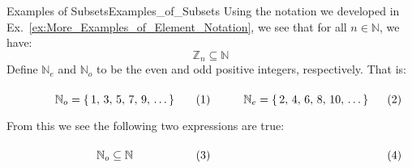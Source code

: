             \begin{lexample}{Examples of Subsets}{Examples_of_Subsets}
                Using the notation we developed in
                Ex.~\ref{ex:More_Examples_of_Element_Notation}, we see that
                for all $n\in\mathbb{N}$, we have:
                \begin{equation}
                    \mathbb{Z}_{n}\subseteq\mathbb{N}
                \end{equation}
                Define $\mathbb{N}_{e}$ and $\mathbb{N}_{o}$ to be the even
                and odd positive integers, respectively. That is:
                \par
                \begin{subequations}
                    \begin{minipage}[b]{0.49\textwidth}
                        \begin{equation}
                            \mathbb{N}_{o}=\{\,1,\,3,\,5,\,7,\,9,\,\dots\,\}
                        \end{equation}
                    \end{minipage}
                    \hfill
                    \begin{minipage}[b]{0.49\textwidth}
                        \begin{equation}
                            \mathbb{N}_{e}=\{\,2,\,4,\,6,\,8,\,10,\,\dots\,\}
                        \end{equation}
                    \end{minipage}
                \end{subequations}
                \par\vspace{2.5ex}
                From this we see the following two expressions are true:
                \par\hfill\par
                \begin{subequations}
                    \begin{minipage}[b]{0.49\textwidth}
                        \begin{equation}
                            \mathbb{N}_{o}\subseteq\mathbb{N}
                        \end{equation}
                    \end{minipage}
                    \hfill
                    \begin{minipage}[b]{0.49\textwidth}
                        \begin{equation}

\end{equation}
\end{minipage}
\end{subequations}
\end{lexample}
